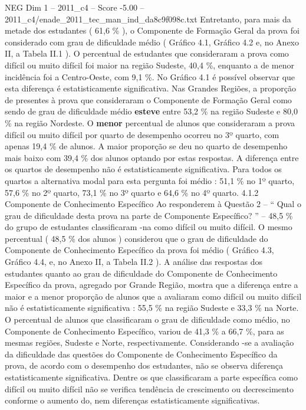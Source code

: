 \begin{textsample}{NEG Dim 1 – 2011\_c4 – Score -5.00 – 2011\_c4/enade\_2011\_tec\_man\_ind\_da8c9f098c.txt}
Entretanto, para mais da metade dos estudantes ( 61,6 \% ), o Componente de Formação Geral da prova foi considerado com grau de dificuldade médio ( Gráfico 4.1, Gráfico 4.2 e, no Anexo II, a Tabela II.1 ).
O percentual de estudantes que consideraram a prova como difícil ou muito difícil foi maior na região Sudeste, 40,4 \%, enquanto a de menor incidência foi a Centro-Oeste, com 9,1 \%.
No Gráfico 4.1 é possível observar que esta diferença é estatisticamente significativa.
Nas Grandes Regiões, a proporção de presentes à prova que consideraram o Componente de Formação Geral como sendo de grau de dificuldade médio \textbf{esteve} entre 53,2 \% na região Sudeste e 80,0 \% na região Nordeste.
O \textbf{menor} percentual de alunos que consideraram a prova difícil ou muito difícil por quarto de desempenho ocorreu no 3º quarto, com apenas 19,4 \% de alunos.
A maior proporção se deu no quarto de desempenho mais baixo com 39,4 \% dos alunos optando por estas respostas.
A diferença entre os quartos de desempenho não é estatisticamente significativa.
Para todos os quartos a alternativa modal para esta pergunta foi médio : 51,1 \% no 1º quarto, 57,6 \% no 2º quarto, 73,1 \% no 3º quarto e 64,6 \% no 4º quarto. 4.1.2 Componente de Conhecimento Específico Ao responderem à Questão 2 – “ Qual o grau de dificuldade desta prova na parte de Componente Específico? ” – 48,5 \% do grupo de estudantes classificaram -na como difícil ou muito difícil.
O mesmo percentual ( 48,5 \% dos alunos ) considerou que o grau de dificuldade do Componente de Conhecimento Específico da prova foi médio ( Gráfico 4.3, Gráfico 4.4, e, no Anexo II, a Tabela II.2 ).
A análise das respostas dos estudantes quanto ao grau de dificuldade do Componente de Conhecimento Específico da prova, agregado por Grande Região, mostra que a diferença entre a maior e a menor proporção de alunos que a avaliaram como difícil ou muito difícil não é estatisticamente significativa : 55,5 \% na região Sudeste e 33,3 \% na Norte.
O percentual de alunos que classificaram o grau de dificuldade como médio, no Componente de Conhecimento Específico, variou de 41,3 \% a 66,7 \%, para as mesmas regiões, Sudeste e Norte, respectivamente.
Considerando -se a avaliação da dificuldade das questões do Componente de Conhecimento Específico da prova, de acordo com o desempenho dos estudantes, não se observa diferença estatisticamente significativa.
Dentre os que classificaram a parte específica como difícil ou muito difícil não se verifica tendência de crescimento ou decrescimento conforme o aumento do, nem diferenças estatisticamente significativas.

\end{textsample}
